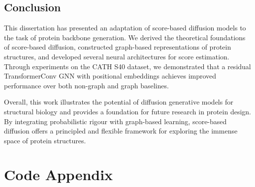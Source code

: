 \documentclass[a4paper,12pt]{article}
\begin{document}
\subsection{Conclusion}\label{subsec:conclusion}
This dissertation has presented an adaptation of score-based diffusion models to the task of protein backbone generation. We derived the theoretical foundations of score-based diffusion, constructed graph-based representations of protein structures, and developed several neural architectures for score estimation. Through experiments on the CATH S40 dataset, we demonstrated that a residual TransformerConv GNN with positional embeddings achieves improved performance over both non-graph and graph baselines. 

Overall, this work illustrates the potential of diffusion generative models for structural biology and provides a foundation for future research in protein design. By integrating probabilistic rigour with graph-based learning, score-based diffusion offers a principled and flexible framework for exploring the immense space of protein structures.

\clearpage

\appendix
\section{Code Appendix}
\end{document}
